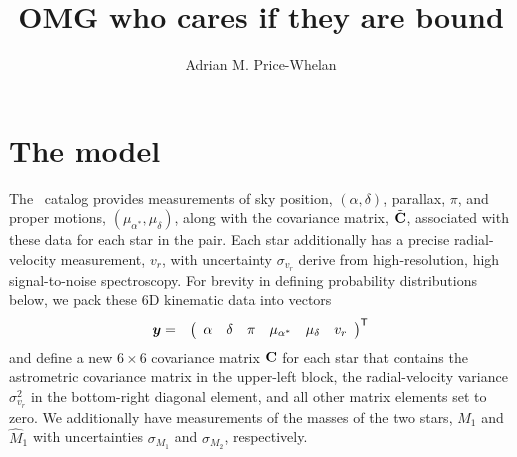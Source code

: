 \documentclass[12pt,letterpaper]{article}
\newcommand{\tgas}{\acronym{TGAS}}
\begin{document}
\sloppy\sloppypar\raggedbottom\frenchspacing %

\title{OMG who cares if they are bound}

\author{
  Adrian M. Price-Whelan
}

\maketitle

\section{The model}
\label{sec:model}

The \tgas\ catalog provides measurements of sky position, $(\alpha, \delta)$,
parallax, $\pi$, and proper motions, $(\mu_{\alpha^*}, \mu_\delta)$, along with
the covariance matrix, $\tilde{\mathbf{C}}$, associated with these data for each
star in the pair.
Each star additionally has a precise radial-velocity measurement, $v_r$, with
uncertainty $\sigma_{v_r}$ derive from high-resolution, high signal-to-noise
spectroscopy.
For brevity in defining probability distributions below, we pack these 6D
kinematic data into vectors
\begin{eqnarray}
  \boldsymbol{y} &=&
      {\left(
        \begin{array}{c c c c c c}
          \alpha &
          \delta &
          \pi &
          \mu_{\alpha^*} &
          \mu_\delta &
          v_r
        \end{array}
      \right)}^{\mathsf{T}}
\end{eqnarray}
and define a new $6\times6$ covariance matrix $\mathbf{C}$ for each star that
contains the astrometric covariance matrix in the upper-left block, the
radial-velocity variance $\sigma_{v_r}^2$ in the bottom-right diagonal element,
and all other matrix elements set to zero.
We additionally have measurements of the masses of the two stars, $\hat{M}_1$
and $\hat{M}_1$ with uncertainties $\sigma_{M_1}$ and $\sigma_{M_2}$,
respectively.
\end{document}
